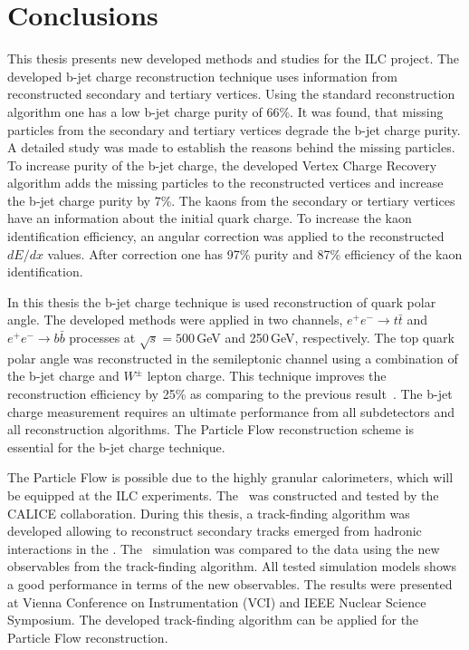 

\section*{Conclusions}
This thesis presents new developed methods and studies for the ILC project.
The developed b-jet charge reconstruction technique uses information from reconstructed secondary and tertiary vertices. 
Using the standard reconstruction algorithm one has a low b-jet charge purity of 66\%.
It was found, that missing particles from the secondary and tertiary vertices degrade the b-jet charge purity. 
A detailed study was made to establish the reasons behind the missing particles. 
To increase purity of the b-jet charge, the developed Vertex Charge Recovery algorithm adds the missing particles to the reconstructed vertices and increase the b-jet charge purity by 7\%.
The kaons from the secondary or tertiary vertices have an information about the initial quark charge. 
To increase the kaon identification efficiency, an angular correction was applied to the reconstructed $dE/dx$ values. 
After correction one has 97\% purity and 87\% efficiency of the kaon identification.

In this thesis the b-jet charge technique is used reconstruction of quark polar angle.
The developed methods were applied in two channels, $e^+e^-\to t\bar{t}$ and $e^+e^-\to b\bar{b}$ processes at $\sqrt{s} = 500$\,GeV and 250\,GeV, respectively.
The top quark polar angle was reconstructed in the semileptonic channel using a combination of the b-jet charge and $W^\pm$ lepton charge.
This technique improves the reconstruction efficiency by 25\% as comparing to the previous result~\cite{bib:ILCTOP}.
The b-jet charge measurement requires an ultimate performance from all subdetectors and all reconstruction algorithms. The Particle Flow reconstruction scheme is essential for the b-jet charge technique.

The Particle Flow is possible due to the highly granular calorimeters, which will be equipped at the ILC experiments. 
The \ecalp\ was constructed and tested by the CALICE collaboration. 
During this thesis, a track-finding algorithm was developed allowing to reconstruct secondary tracks emerged from hadronic interactions in the \ecalp.
The \ecalp\ simulation was compared to the data using the new observables from the track-finding algorithm. 
All tested simulation models shows a good performance in terms of the new observables. 
The results were presented at Vienna Conference on Instrumentation (VCI) and IEEE Nuclear Science Symposium.
The developed track-finding algorithm can be applied for the Particle Flow reconstruction. 